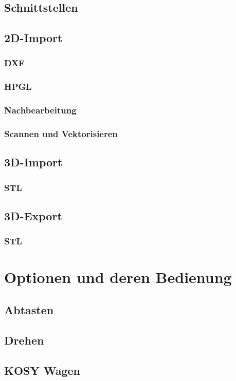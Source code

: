 \documentclass[a4paper]{book}
\begin{document}
	\section{Schnittstellen} 
	\section{2D-Import} 
		\subsection{DXF}
		\subsection{HPGL} 
		\subsection{Nachbearbeitung} 
		\subsection{Scannen und Vektorisieren} 
	\section{3D-Import} 
		\subsection{STL}
	\section{3D-Export} 
		\subsection{STL}

\chapter{Optionen und deren Bedienung} 
	\section{Abtasten}
	\section{Drehen} 
	\section{KOSY Wagen} 
\end{document}
